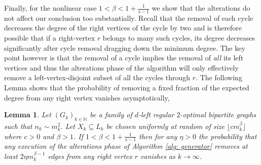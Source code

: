 \documentclass[12pt]{amsart}
\newtheorem{lemma}{Lemma}[section]
\theoremstyle{definition}
\newcommand{\1}{\ensuremath{\mathbb{1}}}
\begin{document}
Finally, for the nonlinear case $1<\beta<1+\frac{1}{s-1}$ we show that the alterations do not affect our conclusion too substantially. Recall that the removal of each cycle decreases the degree of the right vertices of the cycle by two and is therefore possible that if a right-vertex $r$ belongs to many such cycles, its degree decreases significantly after cycle removal dragging down the minimum degree. The key point however is that the removal of a cycle implies the removal of \emph{all} its left vertices and thus the alterations phase of the algorithm will only effectively remove a left-vertex-disjoint subset of all the cycles through $r$. The following Lemma shows that the probability of removing a fixed fraction of the expected degree from any right vertex vanishes asymptotically,

\begin{lemma} \label{lem: rmin_alterations} Let $(G_k)_{k\in\mathbb N}$ be a family of $d$-left regular $2$-optimal bipartite graphs such that $n_k \sim m_k^2$. Let $X_k \subseteq L_k$ be chosen uniformly at random of size 
$\lfloor c m_k^\beta\rfloor$ where $c>0$ and $\beta>1$.
If $1<\beta<1+\frac{1}{s-1}$ then for any $\eta>0$ the probability that any execution of the alterations phase of Algorithm \ref{alg: generator} removes at least $2\eta m_k^{\beta-1} $ edges from any right vertex $r$ vanishes as $k\rightarrow \infty$. 
\end{lemma}
\end{document}
